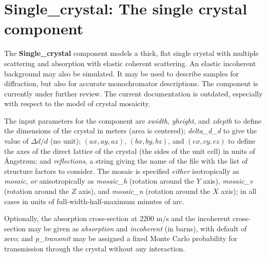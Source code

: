 \section{Single\_crystal: The single crystal component}
\label{s:Single_crystal}


The \textbf{Single\_crystal} component models a thick, flat single crystal
with multiple scattering and absorption with elastic coherent scattering.
An elastic incoherent background may also be simulated.
It may be used to describe samples for diffraction,
but also for accurate monochromator descriptions.
The component is currently under further review. The current documentation is outdated, especially with respect to the model of crystal mosaicity.

The input parameters for the component are \textit{xwidth},
\textit{yheight}, and \textit{zdepth} to define the dimensions of the
crystal in meters (area is centered); \textit{delta\_d\_d} to give the
value of $\Delta d/d$ (no unit);
$(\textit{ax}, \textit{ay}, \textit{az})$, $(\textit{bx}, \textit{by},
\textit{bz})$, and $(\textit{cx}, \textit{cy}, \textit{cz})$ to define
the axes of the direct lattice of the crystal (the sides of the unit
cell) in units of {\AA}ngstr{\o}m; and \textit{reflections}, a string
giving the name of the file with the list of structure factors to
consider.
The mosaic is specified \emph{either} isotropically as
\textit{mosaic}, \emph{or} anisotropically as \textit{mosaic\_h}
(rotation around the $Y$ axis), \textit{mosaic\_v} (rotation around the
$Z$ axis), and \textit{mosaic\_n} (rotation around the $X$ axis); in all
cases in units of full-width-half-maximum minutes of arc.

Optionally, the absorption cross-section at 2200 m/s and the incoherent
cross-section may be given as \textit{absorption} and
\textit{incoherent} (in barns), with default of zero; and
\textit{p\_transmit} may be assigned a fixed Monte Carlo probability for
transmission through the crystal without any interaction.

